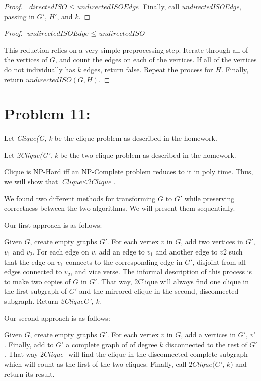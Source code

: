 \documentclass[12pt]{article}
\begin{document}
\begin{proof}{$\textit{ directedISO } \leq \textit{ undirectedISOEdge}$}
Finally, call \textit{undirectedISOEdge}, passing in $G'$, $H'$, and $k$.

\end{proof}

\begin{proof}{$\textit{undirectedISOEdge } \leq \textit{ undirectedISO}$}

This reduction relies on a very simple preprocessing step. Iterate through all of the vertices of $G$, and count the edges on each of the vertices. If all of the vertices do not individually has $k$ edges, return false. Repeat the process for $H$. Finally, return $\textit{undirectedISO}(G, H)$.

\end{proof}

\section*{Problem 11:}

Let \textit{Clique(G, k} be the clique problem as described in the homework.

Let \textit{2Clique(G', k} be the two-clique problem as described in the homework.

Clique is NP-Hard iff an NP-Complete problem reduces to it in poly time. Thus, we will show that $\textit{Clique}  \leq \textit{2Clique}$.

We found two different methods for transforming $G$ to $G'$ while preserving correctness between the two algorithms. We will present them sequentially.

Our first approach is as follows:

Given $G$, create empty graphs $G'$. For each vertex $v$ in $G$, add two vertices in $G'$, $v_{1}$ and $v_{2}$. For each edge on $v$, add an edge to $v_{1}$ and another edge to $v{2}$ such that the edge on $v_{1}$ connects to the corresponding edge in $G'$, disjoint from all edges connected to $v_{2}$, and vice verse. The informal description of this process is to make two copies of $G$ in $G'$. That way, 2Clique will always find one clique in the first subgraph of $G'$ and the mirrored clique in the second, disconnected subgraph. Return \textit{2Clique{G', k}}.

Our second approach is as follows:

Given $G$, create empty graphs $G'$. For each vertex $v$ in $G$, add a vertices in $G'$, $v'$. Finally, add to $G'$ a complete graph of of degree $k$ disconnected to the rest of $G'$. That way $\textit{2Clique }$ will find the clique in the disconnected complete subgraph which will count as the first of the two cliques. Finally, call $\textit{2Clique(G', k)}$ and return its result.
\end{document}
